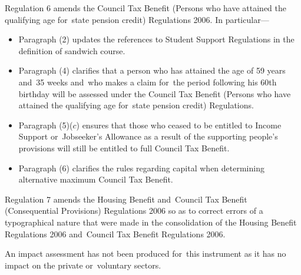 \documentclass[12pt,a4paper]{article}
\begin{document}
Regulation 6 amends the Council Tax Benefit (Persons who have attained the qualifying age for~state pension credit) Regulations 2006. In particular---

\begin{itemize}
\item
    Paragraph (2) updates the references to Student Support Regulations in the definition of sandwich course.

\item
    Paragraph (4) clarifies that a person who has attained the age of 59 years and~35 weeks and~who makes a claim for~the period following his 60th birthday will be assessed under the Council Tax Benefit (Persons who have attained the qualifying age for~state pension credit) Regulations.

\item
    Paragraph (5)($c$)  ensures that those who ceased to be entitled to Income Support or~Jobseeker’s Allowance as a result of the supporting people’s provisions will still be entitled to full Council Tax Benefit.

\item
    Paragraph (6) clarifies the rules regarding capital when determining alternative maximum Council Tax Benefit. 
\end{itemize}

Regulation 7 amends the Housing Benefit and~Council Tax Benefit (Consequential Provisions) Regulations 2006 so as to correct errors of a typographical nature that were made in the consolidation of the Housing Benefit Regulations 2006 and~Council Tax Benefit Regulations 2006.

An impact assessment has not been produced for~this instrument as it has no impact on the private or~voluntary sectors. 
\end{document}
